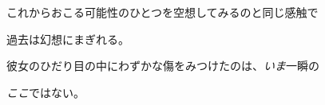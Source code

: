   これからおこる可能性のひとつを空想してみるのと同じ感触で

  過去は幻想にまぎれる。

  彼女のひだり目の中にわずかな傷をみつけたのは、\emph{いま}一瞬の

  \emph{ここ}ではない。
\pagebreak
